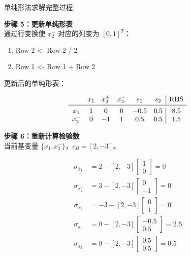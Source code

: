 \begin{exbox}{单纯形法求解完整过程}
        \medskip
        
        \textbf{步骤 5：更新单纯形表}\\
        通过行变换使 \( x_2^- \) 对应的列变为 \( [0, 1]^T \)：
        \begin{enumerate}
          \item Row 2 <- Row 2 / 2  
          \item Row 1 <- Row 1 + Row 2  
        \end{enumerate}
        
        更新后的单纯形表：
        
        \[
        \begin{array}{cccccc|c}
         & x_1 & x_2^+ & x_2^- & s_1 & s_2 & \text{RHS} \\
        \midrule
        x_1 & 1 & 0 & 0 & -0.5 & 0.5 & 8.5 \\
        x_2^{-} & 0 & -1 & 1 & 0.5 & 0.5 & 1.5 \\
        \end{array}
        \]
        
        \medskip
        
        \textbf{步骤 6：重新计算检验数}\\
        当前基变量 \( \{x_1, x_2^-\} \)，\( c_B = [2, -3] \)。
        
        \[
        \begin{align*}
        \sigma_{x_1} &= 2 - [2, -3] \begin{bmatrix}1\\0\end{bmatrix} = 0 \\
        \sigma_{x_2^+} &= 3 - [2, -3] \begin{bmatrix}0\\-1\end{bmatrix} = 0 \\
        \sigma_{x_2^-} &= -3 - [2, -3] \begin{bmatrix}0\\1\end{bmatrix} = 0 \\
        \sigma_{s_1} &= 0 - [2, -3] \begin{bmatrix}-0.5\\0.5\end{bmatrix} = 2.5 \\
        \sigma_{s_2} &= 0 - [2, -3] \begin{bmatrix}0.5\\0.5\end{bmatrix} = 0.5 \\
        \end{align*}
        \]
        

\end{exbox}
